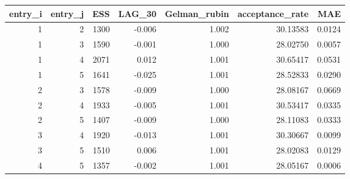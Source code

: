 \begin{longtable}{rrrrrrr}
\toprule
entry\_i & entry\_j & ESS & LAG\_30 & Gelman\_rubin & acceptance\_rate & MAE \\ 
\midrule
1 & 2 & 1300 & -0.006 & 1.002 & 30.13583 & 0.0124 \\ 
1 & 3 & 1590 & -0.001 & 1.000 & 28.02750 & 0.0057 \\ 
1 & 4 & 2071 & 0.012 & 1.001 & 30.65417 & 0.0531 \\ 
1 & 5 & 1641 & -0.025 & 1.001 & 28.52833 & 0.0290 \\ 
2 & 3 & 1578 & -0.009 & 1.000 & 28.08167 & 0.0669 \\ 
2 & 4 & 1933 & -0.005 & 1.001 & 30.53417 & 0.0335 \\ 
2 & 5 & 1407 & -0.009 & 1.000 & 28.11083 & 0.0333 \\ 
3 & 4 & 1920 & -0.013 & 1.001 & 30.30667 & 0.0099 \\ 
3 & 5 & 1510 & 0.006 & 1.001 & 28.02083 & 0.0129 \\ 
4 & 5 & 1357 & -0.002 & 1.001 & 28.05167 & 0.0006 \\ 
\bottomrule
\end{longtable}

